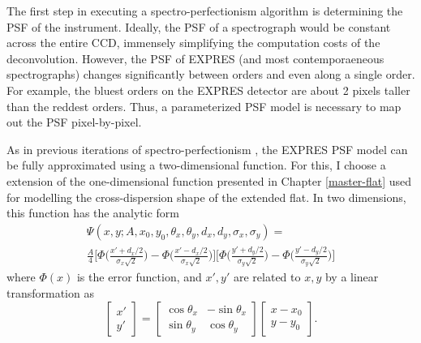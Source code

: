 The first step in executing a spectro-perfectionism algorithm is determining the PSF of the instrument. Ideally, the PSF of a spectrograph would be constant across the entire CCD, immensely simplifying the computation costs of the deconvolution. However, the PSF of EXPRES (and most contemporaeneous spectrographs) changes significantly between orders and even along a single order. For example, the bluest orders on the EXPRES detector are about 2 pixels taller than the reddest orders. Thus, a parameterized PSF model is necessary to map out the PSF pixel-by-pixel.

As in previous iterations of spectro-perfectionism \citep{bolton_spectro-perfectionism_2009, cornachione_full_2019}, the EXPRES PSF model can be fully approximated using a two-dimensional function. For this, I choose a extension of the one-dimensional function presented in Chapter \ref{master-flat} used for modelling the cross-dispersion shape of the extended flat. In two dimensions, this function has the analytic form
\begin{multline}
    \Psi(x, y; A, x_0, y_0, \theta_x, \theta_y, d_x, d_y, \sigma_x, \sigma_y) = \\
    \frac{A}{4} \Bigg[\Phi\bigg(\frac{x' + d_x/2}{\sigma_x \sqrt{2}}\bigg) - \Phi\bigg(\frac{x' - d_x/2}{\sigma_x \sqrt{2}}\bigg)\Bigg] \Bigg[\Phi\bigg(\frac{y' + d_y/2}{\sigma_y \sqrt{2}}\bigg) - \Phi\bigg(\frac{y' - d_y/2}{\sigma_y \sqrt{2}}\bigg)\Bigg]
    \label{eq:expres_psf}
\end{multline}
where $\Phi(x)$ is the error function, and $x',y'$ are related to $x,y$ by a linear transformation as
\begin{equation}
    \begin{bmatrix}x' \\ y' \end{bmatrix} = 
    \begin{bmatrix}\cos \theta_x & -\sin\theta_x \\ \sin \theta_y & \cos\theta_y\end{bmatrix}\begin{bmatrix}x-x_0 \\ y-y_0\end{bmatrix}.
    \label{eq:pix-transformation}
\end{equation}

